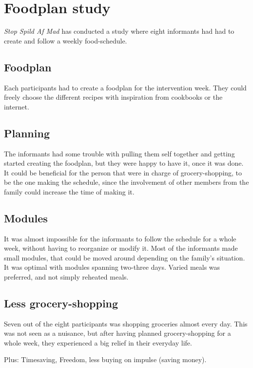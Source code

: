 \section{Foodplan study}
\textit{Stop Spild Af Mad}\cite{madSpild_RapportAdfaerd} has conducted a study where eight informants had had to create and follow a weekly food-schedule.

\subsection{Foodplan}
Each participants had to create a foodplan for the intervention week. They could freely choose the different recipes with inspiration from cookbooks or the internet.

\subsection{Planning}
The informants had some trouble with pulling them self together and getting started creating the foodplan, but they were happy to have it, once it was done. It could be beneficial for the person that were in charge of grocery-shopping, to be the one making the schedule, since the involvement of other members from the family could increase the time of making it.

\subsection{Modules}
It was almost impossible for the informants to follow the schedule for a whole week, without having to reorganize or modify it. Most of the informants made small modules, that could be moved around depending on the family's situation. It was optimal with modules spanning two-three days. Varied meals was preferred, and not simply reheated meals.

\subsection{Less grocery-shopping}
Seven out of the eight participants was shopping groceries almost every day. This was not seen as a nuisance, but after having planned grocery-shopping for a whole week, they experienced a big relief in their everyday life.

Plus: Timesaving, Freedom, less buying on impulse (saving money). 

